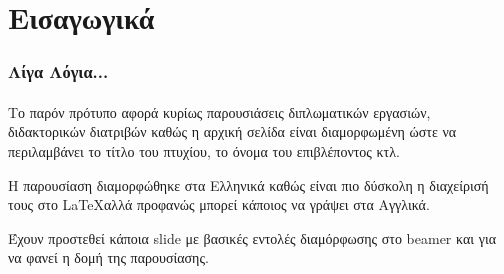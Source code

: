 \section{Εισαγωγικά}
 

\begin{frame}\frametitle{Λίγα Λόγια...}\framesubtitle{}
Το παρόν πρότυπο αφορά κυρίως παρουσιάσεις διπλωματικών εργασιών, διδακτορικών διατριβών καθώς η αρχική σελίδα είναι διαμορφωμένη ώστε να περιλαμβάνει το τίτλο του πτυχίου, το όνομα του επιβλέποντος κτλ.

Η παρουσίαση διαμορφώθηκε στα Ελληνικά καθώς είναι πιο δύσκολη η διαχείρισή τους στο \LaTeX  αλλά προφανώς μπορεί κάποιος να γράψει στα Αγγλικά. 

Έχουν προστεθεί κάποια slide με βασικές εντολές διαμόρφωσης στο beamer και για να φανεί η δομή της παρουσίασης.

\end{frame}
